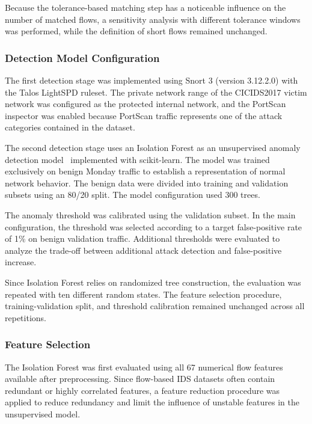 \documentclass[conference]{IEEEtran}
\begin{document}
Because the tolerance-based matching step has a noticeable influence on the number of matched flows, a sensitivity analysis with different tolerance windows was performed, while the definition of short flows remained unchanged.

\subsubsection{Detection Model Configuration}
The first detection stage was implemented using Snort 3 (version 3.12.2.0)
with the Talos LightSPD ruleset. The private network range of the CICIDS2017
victim network was configured as the protected internal network, and the
PortScan inspector was enabled because PortScan traffic represents one of the
attack categories contained in the dataset.

The second detection stage uses an Isolation Forest as an unsupervised anomaly detection model~\cite{liu2008} implemented with scikit-learn. The model was trained exclusively on benign Monday traffic to establish a representation of normal network behavior. The benign data were divided into training and validation subsets
using an 80/20 split. The model configuration used 300 trees.


The anomaly threshold was calibrated using the validation subset. In the main
configuration, the threshold was selected according to a target false-positive
rate of 1\% on benign validation traffic. Additional thresholds were evaluated
to analyze the trade-off between additional attack detection and false-positive
increase.

Since Isolation Forest relies on randomized tree construction, the evaluation
was repeated with ten different random states. The feature selection procedure,
training-validation split, and threshold calibration remained unchanged across
all repetitions.

\subsubsection{Feature Selection}
\label{subsubsec:feature-selection}
The Isolation Forest was first evaluated using all 67 numerical flow features available after preprocessing. Since flow-based IDS datasets often
contain redundant or highly correlated features, a feature reduction procedure
was applied to reduce redundancy and limit the influence of unstable features in the unsupervised model.
\end{document}
